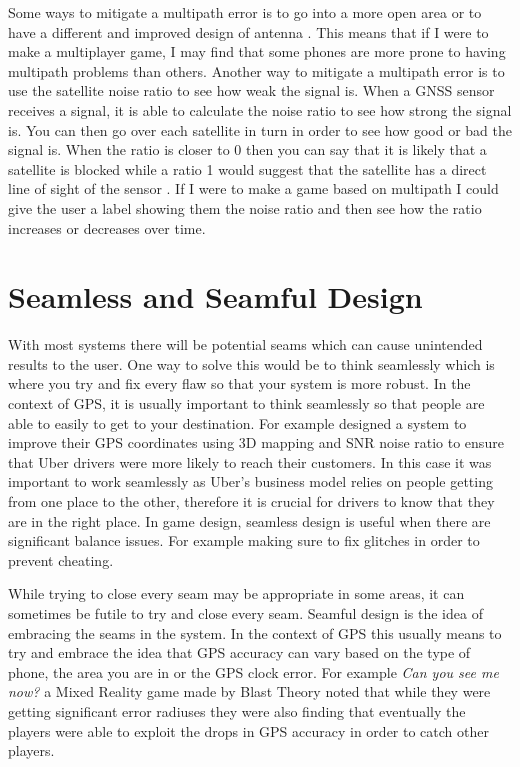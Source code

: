 \documentclass{l4proj}
\begin{document}
Some ways to mitigate a multipath error is to go into a more open area or to have a different and improved design
of antenna \citep{Kos2010}. This means that if I were to make a multiplayer game, I may find that some phones are
more prone to having multipath problems than others. Another way to mitigate a multipath error is to use the 
satellite noise ratio to see how weak the signal is. When a GNSS sensor receives a signal, it is able to calculate 
the noise ratio to see how strong the signal is. You can then go over each satellite in turn in order to see how
good or bad the signal is. When the ratio is closer to 0 then you can say that it is likely that a satellite is blocked
while a ratio 1 would suggest that the satellite has a direct line of sight of the sensor \citep{uberGPS}. If I were
to make a game based on multipath I could give the user a label showing them the noise ratio and then see how the ratio
increases or decreases over time.

\section{Seamless and Seamful Design}
With most systems there will be potential seams which can cause unintended results to the user. One way to solve this would be to think seamlessly which is where you
try and fix every flaw so that your system is more robust. In the context of GPS, it is usually important to think seamlessly
so that people are able to easily to get to your destination. For example \cite{uberGPS} designed a system to improve their
GPS coordinates using 3D mapping and SNR noise ratio to ensure that Uber drivers were more likely to reach their customers. In this
case it was important to work seamlessly as Uber's business model relies on people getting from one place to the other, therefore it
is crucial for drivers to know that they are in the right place. In game design, seamless design is useful when there are significant balance issues. For example making sure to fix
glitches in order to prevent cheating. 

While trying to close every seam may be appropriate in some areas, it can sometimes be futile to try and close every seam.
Seamful design is the idea of embracing the seams in the system. In the context of GPS this usually means to try and embrace
the idea that GPS accuracy can vary based on the type of phone, the area you are in or the GPS clock error. For example 
\emph{Can you see me now?} a Mixed Reality game made by Blast Theory noted that while they were getting significant error radiuses they
were also finding that eventually the players were able to exploit the drops in GPS accuracy in order to catch other players. \citep{canyouseeme}
\end{document}
